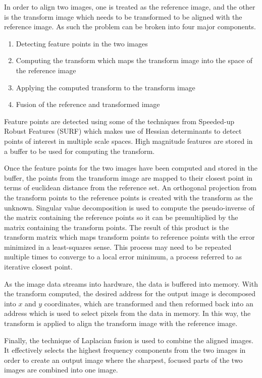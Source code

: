 \documentclass[sigconf]{acmart/acmart}
\begin{document}
In order to align two images, one is treated as the reference image, and the other is the transform image which needs to be transformed to be aligned with the reference image. As such the problem can be broken into four major components. 

\begin{enumerate}
	\item Detecting feature points in the two images
	\item Computing the transform which maps the transform image into the space of the reference image
	\item Applying the computed transform to the transform image
	\item Fusion of the reference and transformed image
\end{enumerate}

Feature points are detected using some of the techniques from Speeded-up Robust Features (SURF) which makes use of Hessian determinants to detect points of interest in multiple scale spaces. High magnitude features are stored in a buffer to be used for computing the transform.

Once the feature points for the two images have been computed and stored in the buffer, the points from the transform image are mapped to their closest point in terms of euclidean distance from the reference set. An orthogonal projection from the transform points to the reference points is created with the transform as the unknown. Singular value decomposition is used to compute the pseudo-inverse of the matrix containing the reference points so it can be premultiplied by the matrix containing the transform points. The result of this product is the transform matrix which maps transform points to reference points with the error minimized in a least-squares sense. This process may need to be repeated multiple times to converge to a local error minimum, a process referred to as iterative closest point.

As the image data streams into hardware, the data is buffered into memory. With the transform computed, the desired address for the output image is decomposed into $x$ and $y$ coordinates, which are transformed and then reformed back into an address which is used to select pixels from the data in memory. In this way, the transform is applied to align the transform image with the reference image.

Finally, the technique of Laplacian fusion is used to combine the aligned images. It effectively selects the highest frequency components from the two images in order to create an output image where the sharpest, focused parts of the two images are combined into one image.
\end{document}

